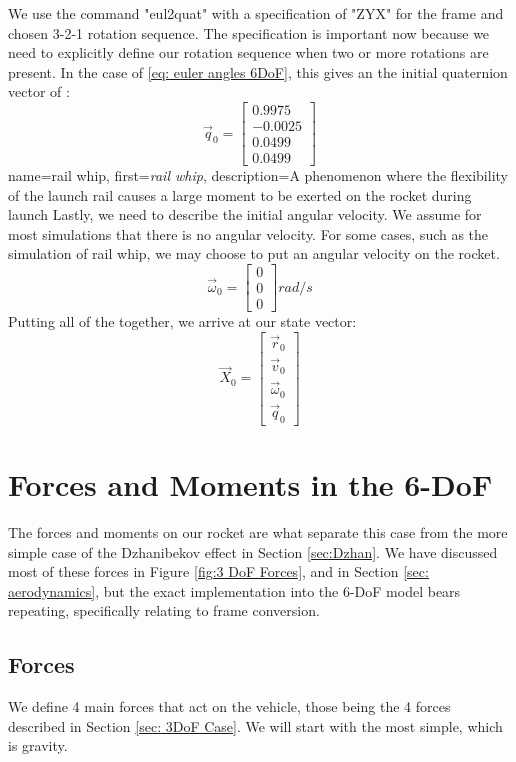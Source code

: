 \documentclass[12pt]{report}
\begin{document}
We use the command "eul2quat" with a specification of "ZYX" for the frame and chosen 3-2-1 rotation sequence. The specification is important now because we need to explicitly define our rotation sequence when two or more rotations are present. In the case of \eqref{eq: euler angles 6DoF}, this gives an the initial \gls{quaternion} vector of :
$$\vec{q}_0=\begin{bmatrix}
    0.9975\\-0.0025\\0.0499\\0.0499
\end{bmatrix}$$
{
    name=rail whip,
    first={\textit{rail whip}},
    description={A phenomenon where the flexibility of the launch rail causes a large moment to be exerted on the rocket during launch}
}
Lastly, we need to describe the initial angular velocity. We assume for most simulations that there is no angular velocity. For some cases, such as the simulation of \gls{rail whip}, we may choose to put an angular velocity on the rocket.
$$\vec{\omega}_0=\begin{bmatrix}
0\\0\\0
\end{bmatrix} rad/s$$
Putting all of the together, we arrive at our \gls{state vector}:
$$\vec{X}_0=\begin{bmatrix}
    \vec{r}_0\\\vec{v}_0\\\vec{\omega}_0\\\vec{q}_0
\end{bmatrix}$$
\section{Forces and Moments in the 6-DoF}
The forces and moments on our rocket are what separate this case from the more simple case of the Dzhanibekov effect in Section \ref{sec:Dzhan}. We have discussed most of these forces in Figure \ref{fig:3 DoF Forces}, and in Section \ref{sec: aerodynamics}, but the exact implementation into the 6-DoF model bears repeating, specifically relating to frame conversion.
\subsection{Forces}\label{6DoF Forces}
We define 4 main forces that act on the vehicle, those being the 4 forces described in Section \ref{sec: 3DoF Case}. We will start with the most simple, which is gravity.
\end{document}
